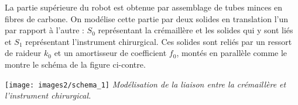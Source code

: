 \documentclass[10pt,fleqn]{article} %
\begin{document}

\noindent\begin{minipage}[c]{.6\linewidth}
La partie supérieure du robot est obtenue par assemblage de tubes minces en fibres de carbone. On modélise cette partie par deux solides en translation l'un par rapport à l'autre : $S_0$ représentant la crémaillère et les solides qui y sont liés et $S_1$ représentant l'instrument chirurgical. Ces solides sont reliés par un ressort de raideur $k_0$ et un amortisseur de coefficient $f_0$, montés en parallèle comme le montre le schéma de la figure ci-contre.%
\end{minipage}\hfill
\begin{minipage}[c]{.36\linewidth}
\begin{center}
	\texttt{[image: images2/schema\_1]}
\textit{Modélisation de la liaison entre la crémaillère et l'instrument chirurgical.\label{p04_robot_endo:fig6}}
\end{center}
\end{minipage}
\end{document}
